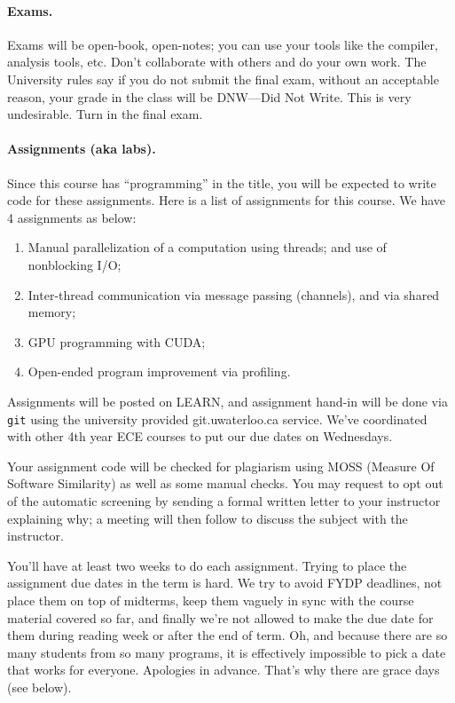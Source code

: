 \documentclass[letterpaper,10pt]{article}
\begin{document}
\paragraph{Exams.} Exams will be open-book, open-notes; you can use your tools like the compiler, analysis tools, etc. Don't collaborate with others and do your own work. The University rules say if you do not submit the final exam, without an acceptable reason, your grade in the class will be DNW---Did Not Write. This is very undesirable. Turn in the final exam.



\paragraph{Assignments (aka labs).} Since this course has ``programming'' in the 
title, you will be expected to write code for these assignments.  Here
is a list of assignments for this course. We have 4
assignments as below:

\begin{enumerate}
\item Manual parallelization of a computation using threads; and use of nonblocking I/O;
\item Inter-thread communication via message passing (channels), and via shared memory;
\item GPU programming with CUDA;
\item Open-ended program improvement via profiling.
\end{enumerate}
Assignments will be posted on LEARN, and assignment hand-in will be done via \texttt{git} using the university provided git.uwaterloo.ca service. We've coordinated with other 4th year ECE courses to put our due dates on Wednesdays.

Your assignment code will be checked for plagiarism using MOSS (Measure Of Software Similarity) as well as some manual checks. You may request to opt out of the automatic screening by sending a formal written letter to your instructor explaining why; a meeting will then follow to discuss the subject with the instructor.

You'll have at least two weeks to do each assignment. Trying to place the assignment due dates in the term is hard. We try to avoid FYDP deadlines, not place them on top of midterms, keep them vaguely in sync with the course material covered so far, and finally we're not allowed to make the due date for them during reading week or after the end of term. Oh, and because there are so many students from so many programs, it is effectively impossible to pick a date that works for everyone. Apologies in advance. That's why there are grace days (see below).
\end{document}
